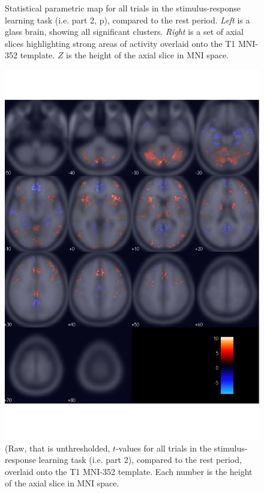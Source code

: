 \documentclass[doc,12pt]{apa}        %
\begin{document}
\begin{figure}[tp]
    \centering
    \caption{Statistical parametric map for all trials in the stimulus-response learning task (i.e. part 2, p\pageref{subsub:whatwhen}), compared to the rest period.  \emph{Left} is a glass brain, showing all significant clusters.  \emph{Right} is a set of axial slices highlighting strong areas of activity overlaid onto the T1 MNI-352 template.  $Z$ is the height of the axial slice in MNI space.}
	\label{fig:gl}
\end{figure}

\begin{figure}[tp]
	\includegraphics{f_map_gl_raw_t}
    \centering
	\caption{(Raw, that is unthresholded, $t$-values for all trials in the stimulus-response learning task (i.e. part 2), compared to the rest period,  overlaid onto the T1 MNI-352 template.   Each number is the height of the axial slice in MNI space.}
	\label{fig:glraw}
\end{figure}
\end{document}
